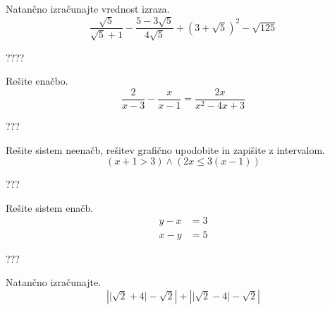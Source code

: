 \documentclass[addpoints,12pt]{exam}
\begin{document}
\newpage
\begin{questions}


    \question[6]
    Natančno izračunajte vrednost izraza.
    $$ \dfrac{\sqrt{5}}{\sqrt{5}+1}-\dfrac{5-3\sqrt{5}}{4\sqrt{5}}+\left(3+\sqrt{5}\right)^2-\sqrt{125} $$

    \begin{solution}[6cm]
        ????
    \end{solution}
    
    
    \newpage

    \question[4]
    Rešite enačbo.
    $$ \dfrac{2}{x-3}-\dfrac{x}{x-1}=\dfrac{2x}{x^2-4x+3} $$
    
    
    \begin{solution}[9cm]
        ???
    \end{solution}

        

\newpage
    \question[5]
    Rešite sistem neenačb, rešitev grafično upodobite in zapišite z intervalom.
    $$ \left(x+1>3\right)\land\left(2x\leq 3(x-1)\right) $$
    
    
    \begin{solution}[8cm]
        ???
    \end{solution}


    \newpage 


    \question[4]
    Rešite sistem enačb.
    $$ \begin{aligned}
        y-x&=3 \\ x-y&=5
    \end{aligned} $$
    
    
    \begin{solution}[9cm]
        ???
    \end{solution}



    
    




    \newpage 

    
    \question[4]
    Natančno izračunajte.
    $$ \left\lvert \lvert\sqrt{2}+4\rvert-\sqrt{2}\right\rvert + \left\lvert \lvert\sqrt{2}-4\rvert-\sqrt{2}\right\rvert $$
    

\end{questions}
\end{document}
